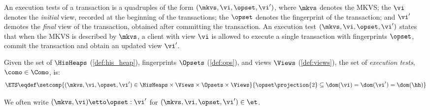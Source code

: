 An execution tests of a transaction is a quadruples of the form \( (\mkvs, \vi, \opset, \vi') \), where $\mkvs$ denotes the MKVS;
the $\vi$ denotes the \emph{initial} view, recorded at the beginning of the transactions; 
the $\opset$ denotes the fingerprint of the transaction; and 
$\vi'$ demotes the \emph{final} view of the transaction, obtained after committing the transaction. 
An execution test $(\mkvs, \vi, \opset, \vi')$ states that when the MKVS is described by $\mkvs$, a client with view $\vi$ is allowed to execute a single transaction with fingerprints $\opset$, commit the transaction and obtain an updated view $\vi'$. 
%
%
%
%
\begin{definition}
\label{def:consistency-models}
\label{def:executiontests}
Given the set of $\HisHeaps$ (\cref{def:his_heap}), fingerprints $\Opsets$ (\cref{def:ops}), and views $\Views$ (\cref{def:views}), the set of \emph{execution tests}, \( \como \in \Como \), is:
\[
        \ETS \eqdef  
		\setcomp{
			(\mkvs, \vi, \opset, \vi') \in \HisHeaps \times \Views \times \Opsets \times \Views
		} 
		{
		\opset\projection{2} \subseteq \dom(\vi) = \dom(\vi') = \dom(\hh)
		}       
\]
\end{definition}
%
We often write $(\mkvs, \vi) \etto \opset : \vi'$ for  $(\mkvs, \vi, \opset, \vi') \in \et$.


